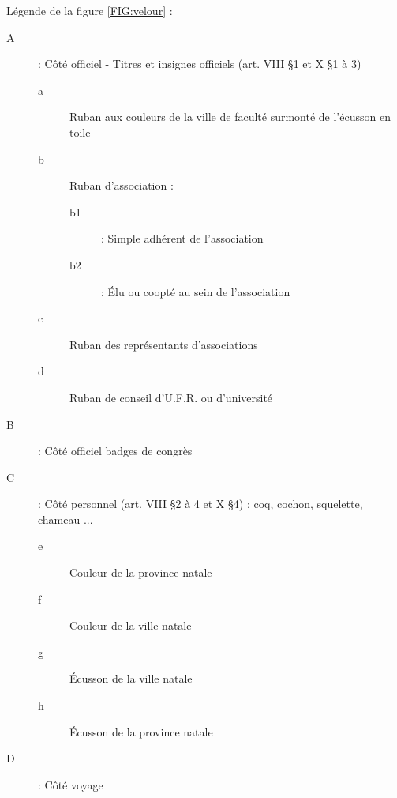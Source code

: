 Légende de la figure \ref{FIG:velour} :
\begin{description}
\item[A]: Côté officiel - Titres et insignes officiels (art. VIII \S 1 et X \S 1 à 3)

	\begin{description}
	\item[a] Ruban aux couleurs de la ville de faculté surmonté de l'écusson en toile
	\item[b] Ruban d'association :
		\begin{description}
		\item[b1] : Simple adhérent de l'association
		\item[b2] : Élu ou coopté au sein de l'association
		\end{description}	
	\item[c] Ruban des représentants d'associations
	\item[d] Ruban de conseil d'U.F.R. ou d'université
	\end{description}

\item[B]: Côté officiel badges de congrès
\item[C]: Côté personnel (art. VIII \S 2 à 4 et X \S 4) : coq, cochon, squelette, chameau ...
	\begin{description}
	\item[e] Couleur de la province natale
	\item[f] Couleur de la ville natale
	\item[g] Écusson de la ville natale
	\item[h] Écusson de la province natale
	\end{description}
\item[D]: Côté voyage
\end{description}

